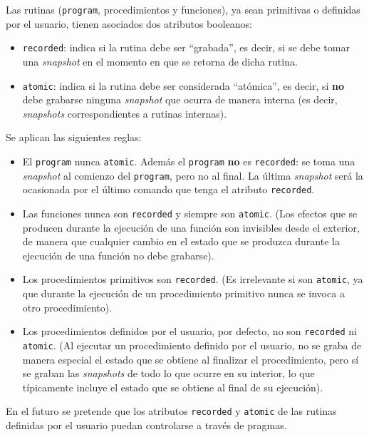\documentclass{article}
\begin{document}
Las rutinas (\texttt{program}, procedimientos y funciones),
ya sean primitivas o definidas por el usuario,
tienen asociados dos atributos booleanos:
\begin{itemize}
\item \texttt{recorded}:
      indica si la rutina debe ser ``grabada'', es decir,
      si se debe tomar una {\em snapshot} en el momento en que se retorna de dicha rutina.
\item \texttt{atomic}:
      indica si la rutina debe ser considerada ``at\'omica'', es decir,
      si {\bf no} debe grabarse ninguna {\em snapshot} que ocurra de manera interna
      (es decir, {\em snapshots} correspondientes a rutinas internas).
\end{itemize}
Se aplican las siguientes reglas:
\begin{itemize}
\item El \texttt{program} nunca \texttt{atomic}.
      Además el \texttt{program} {\bf no} es \texttt{recorded}:
      se toma una {\em snapshot} al comienzo del \texttt{program},
      pero no al final. La \'ultima {\em snapshot} será la
      ocasionada por el \'ultimo comando que tenga el atributo \texttt{recorded}.
\item Las funciones nunca son \texttt{recorded} y siempre son \texttt{atomic}.
      (Los efectos que se producen durante la ejecuci\'on de una funci\'on
      son invisibles desde el exterior, de manera que cualquier cambio en el estado
      que se produzca durante la ejecuci\'on de una funci\'on no debe grabarse).
\item Los procedimientos primitivos son \texttt{recorded}.
      (Es irrelevante si son \texttt{atomic}, ya que durante la ejecuci\'on de un procedimiento
      primitivo nunca se invoca a otro procedimiento).
\item Los procedimientos definidos por el usuario, por defecto,
      no son \texttt{recorded} ni \texttt{atomic}.
      (Al ejecutar un procedimiento definido por el usuario, no se graba
      de manera especial el estado que se obtiene al finalizar el procedimiento,
      pero s\'i se graban las {\em snapshots} de todo lo que ocurre en su interior,
      lo que t\'ipicamente incluye el estado que se obtiene al final de su ejecuci\'on).
\end{itemize}
En el futuro se pretende que los atributos \texttt{recorded} y \texttt{atomic}
de las rutinas definidas por el usuario puedan controlarse a trav\'es de pragmas.
\end{document}
